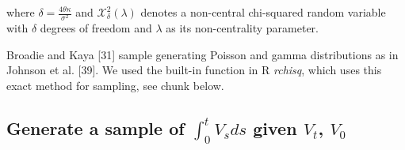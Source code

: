\documentclass[12pt,twoside]{reedthesis}
\theoremstyle{definition}
\theoremstyle{definition}
\theoremstyle{remark}
\begin{document}
  where \(\delta = \frac{4 \theta \kappa}{\sigma^2}\) and
  \(\mathcal{X}_{\delta}^{2}(\lambda)\) denotes a non-central chi-squared
  random variable with \(\delta\) degrees of freedom and \(\lambda\) as
  its non-centrality parameter.
  
  Broadie and Kaya {[}31{]} sample generating Poisson and gamma
  distributions as in Johnson et al. {[}39{]}. We used the built-in
  function in R \emph{rchisq}, which uses this exact method for sampling,
  see chunk below.
  \begin{Shaded}
  \begin{Highlighting}[]
  \StringTok{ }\NormalTok{(} \OperatorTok{*}\StringTok{ }\OperatorTok{*}\StringTok{ }\OperatorTok{/}\OperatorTok{^}
  \StringTok{ }\OperatorTok{^} \OperatorTok{*}\StringTok{ }\NormalTok{(} \OperatorTok{-}\StringTok{ }\NormalTok{(}\OperatorTok{-}\OperatorTok{*}\OperatorTok{/}\NormalTok{(}\OperatorTok{*}
  \StringTok{ }\OperatorTok{-}
  
  \StringTok{ }\NormalTok{(}\OperatorTok{*}\OperatorTok{*}\NormalTok{(}\OperatorTok{-}\OperatorTok{*}\OperatorTok{*}\OperatorTok{/}\OperatorTok{^} \OperatorTok{*}\StringTok{ }\NormalTok{(}\OperatorTok{-}\NormalTok{(}\OperatorTok{-}\OperatorTok{*}
  \StringTok{ }\OperatorTok{*}\StringTok{ }\OperatorTok{::}\NormalTok{(} \NormalTok{, }
  \end{Highlighting}
  \end{Shaded}
  \subsection{\texorpdfstring{Generate a sample of \(\int_0^t V_sds\)
  given \(V_t\),
  \(V_0\)}{Generate a sample of \textbackslash{}int\_0\^{}t V\_sds given V\_t, V\_0}}\label{generate-a-sample-of-int_0t-v_sds-given-v_t-v_0}
  
\end{document}
